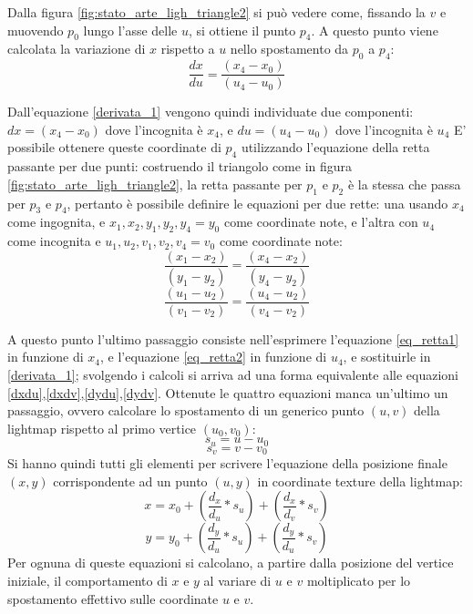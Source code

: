 Dalla figura \ref{fig:stato_arte_ligh_triangle2} si può vedere come, fissando la $v$ e muovendo $p_0$ lungo l’asse delle $u$, si ottiene il punto $p_4$. A questo punto viene calcolata la variazione di $x$ rispetto a $u$ nello spostamento da $p_0$ a $p_4$:
\begin{equation}
\frac{dx}{du} = \frac{(x_4 - x_0)}{(u_4 - u_0)} 
\label{derivata_1}
\end{equation}

Dall'equazione \ref{derivata_1} vengono quindi individuate due componenti: $dx = (x_4-x_0)$ dove l’incognita è $x_4$, e $du = (u_4-u_0)$ dove l’incognita è $u_4$ E’ possibile ottenere queste coordinate di $p_4$ utilizzando l’equazione della retta passante per due punti: costruendo il triangolo come in figura \ref{fig:stato_arte_ligh_triangle2}, la retta passante per $p_1$ e $p_2$ è la stessa che passa per $p_3$ e $p_4$, pertanto è possibile definire le equazioni per due rette: una usando $x_4$ come ingognita, e $x_1,x_2,y_1,y_2,y_4=y_0$ come coordinate note, e l’altra con $u_4$ come incognita e $u_1,u_2,v_1,v_2,v_4=v_0$ come coordinate note:
\begin{equation}
\frac{(x_1 - x_2)}{(y_1 - y_2)} = \frac{(x_4 - x_2)}{(y_4 - y_2)} 
\label{eq_retta1}
\end{equation}
\begin{equation}
\frac{(u_1 - u_2)}{(v_1 - v_2)} = \frac{(u_4 - u_2)}{(v_4 - v_2)} 
\label{eq_retta2}
\end{equation}

A questo punto l’ultimo passaggio consiste nell'esprimere l'equazione \ref{eq_retta1} in funzione di $x_4$, e l'equazione \ref{eq_retta2} in funzione di $u_4$, e sostituirle in \ref{derivata_1}; svolgendo i calcoli si arriva ad una forma equivalente alle equazioni \ref{dxdu},\ref{dxdv},\ref{dydu},\ref{dydv}. 
Ottenute le quattro equazioni manca un’ultimo un passaggio, ovvero calcolare lo spostamento di un generico punto $(u,v)$ della lightmap rispetto al primo vertice $(u_0,v_0)$:
\begin{equation}
s_u = u - u_0
\end{equation}
\begin{equation}
s_v = v - v_0
\end{equation}
Si hanno quindi tutti gli elementi per scrivere l’equazione della posizione finale $(x,y)$ corrispondente ad un punto $(u,y)$ in coordinate texture della lightmap:
\begin{equation}
x = x_0 + (\frac{d_x}{d_u} * s_u) + (\frac{d_x}{d_v} * s_v)
\label{eq_fin1}
\end{equation}
\begin{equation}
y = y_0 + (\frac{d_y}{d_u} * s_u) + (\frac{d_y}{d_u} * s_v)
\label{eq_fin2}
\end{equation}
Per ognuna di queste equazioni si calcolano, a partire dalla posizione del vertice iniziale, il comportamento di $x$ e $y$ al variare di $u$ e $v$ moltiplicato per lo spostamento effettivo sulle coordinate $u$ e $v$.

